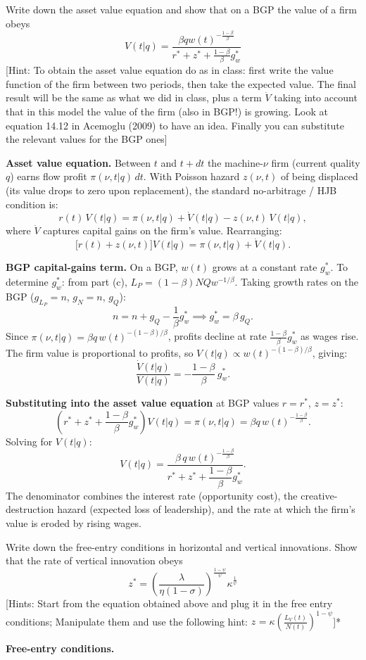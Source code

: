 \documentclass[11pt]{exam}
\begin{document}
\begin{questions}
\question Write down the asset value equation and show that on a BGP the value of a firm obeys
\[
	V(t|q)=\frac{\beta qw(t)^{-\frac{1-\beta}{\beta}}}{r^{*}+z^{*}+\frac{1-\beta}{\beta}g_{w}^{*}}
\]
[Hint: To obtain the asset value equation do as in class: first write the value function of the firm between two periods, then take the expected value. The final result will be the same as what we did in class, plus a term $\dot{V}$ taking into account that in this model the value of the firm (also in BGP!) is growing. Look at equation 14.12 in Acemoglu (2009) to have an idea. Finally you can substitute the relevant values for the BGP ones]
\begin{solution}
\textbf{Asset value equation.}  Between $t$ and $t+dt$ the machine-$\nu$ firm (current quality $q$) earns flow profit $\pi(\nu,t|q)\,dt$.  With Poisson hazard $z(\nu,t)$ of being displaced (its value drops to zero upon replacement), the standard no-arbitrage / HJB condition is:
\[
	r(t)\,V(t|q) = \pi(\nu,t|q) + \dot{V}(t|q) - z(\nu,t)\,V(t|q),
\]
where $\dot{V}$ captures capital gains on the firm's value.  Rearranging:
\[
	\bigl[r(t)+z(\nu,t)\bigr]V(t|q) = \pi(\nu,t|q) + \dot{V}(t|q).
\]

\textbf{BGP capital-gains term.}  On a BGP, $w(t)$ grows at a constant rate $g_{w}^{*}$.  To determine $g_{w}^{*}$: from part (c), $L_{P}=(1-\beta)NQw^{-1/\beta}$.  Taking growth rates on the BGP ($g_{L_{P}}=n$, $g_{N}=n$, $g_{Q}$):
\[
	n = n + g_{Q} - \frac{1}{\beta}g_{w}^{*} \implies g_{w}^{*}=\beta\,g_{Q}.
\]
Since $\pi(\nu,t|q)=\beta q\,w(t)^{-(1-\beta)/\beta}$, profits decline at rate $\frac{1-\beta}{\beta}g_{w}^{*}$ as wages rise.  The firm value is proportional to profits, so $V(t|q)\propto w(t)^{-(1-\beta)/\beta}$, giving:
\[
	\frac{\dot{V}(t|q)}{V(t|q)} = -\frac{1-\beta}{\beta}\,g_{w}^{*}.
\]

\textbf{Substituting into the asset value equation} at BGP values $r=r^{*}$, $z=z^{*}$:
\[
	\left(r^{*}+z^{*}+\frac{1-\beta}{\beta}g_{w}^{*}\right)V(t|q) = \pi(\nu,t|q) = \beta q\,w(t)^{-\frac{1-\beta}{\beta}}.
\]
Solving for $V(t|q)$:
\[
	\boxed{V(t|q)=\frac{\beta\,q\,w(t)^{-\frac{1-\beta}{\beta}}}{r^{*}+z^{*}+\dfrac{1-\beta}{\beta}g_{w}^{*}}.}
\]
The denominator combines the interest rate (opportunity cost), the creative-destruction hazard (expected loss of leadership), and the rate at which the firm's value is eroded by rising wages.
\end{solution}

\question Write down the free-entry conditions in horizontal and vertical innovations. Show that the rate of vertical innovation obeys
\[
	z^{*}=\left(\frac{\lambda}{\eta(1-\sigma)}\right)^{\frac{1-\psi}{\psi}}\kappa^{\frac{1}{\psi}}
\]
[Hints: Start from the equation obtained above and plug it in the free entry conditions; Manipulate them and use the following hint: $z^{}=\kappa\left(\frac{L_{V}(t)}{N(t)}\right)^{1-\psi}$]*
\begin{solution}
\textbf{Free-entry conditions.}


\end{solution}
\end{questions}
\end{document}
